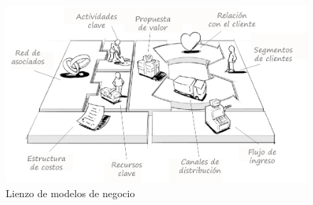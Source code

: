 \begin{figure}[h]
  \centering
  \includegraphics[width=0.8\linewidth]{figures/images/lienzo_modelos.jpg}
  \caption{Lienzo de modelos de negocio}
  \label{fig:bmc}
\end{figure}